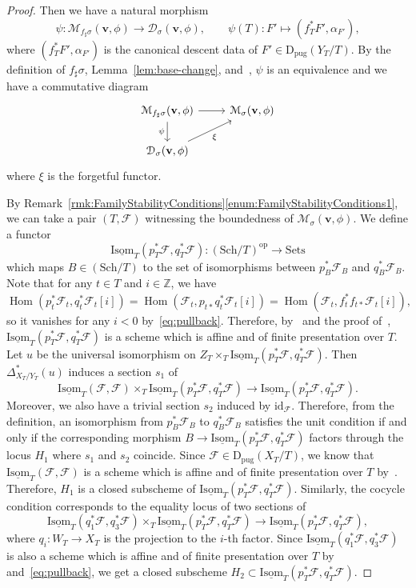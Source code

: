 \documentclass[11pt, reqno]{amsart}
\numberwithin{equation}{section}
\theoremstyle{plain}
\theoremstyle{remark}
\theoremstyle{definition}
\theoremstyle{italicsname}
\newcommand{\bv}{\mathbf{v}}
\newcommand{\Dpug}{\mathrm{D_{pug}}}
\DeclareMathOperator{\Hom}{Hom}
\newcommand{\cF}{\mathcal{F}}
\newcommand{\cM}{\mathcal{M}}
\def\ZZ{\ensuremath{\mathbb{Z}}}
\def\citestacks#1{\cite[\href{https://stacks.math.columbia.edu/tag/#1}{#1}]{stacks-project}}
\begin{document}
\begin{proof}
Then we have a natural morphism
\[
\psi\colon\cM_{f_{\sharp}{\sigma}}(\bv,\phi)\longrightarrow \mathcal{D}_{{\sigma}}(\bv,\phi), \qquad \psi(T)\colon F'\longmapsto (f^*_TF', \alpha_{F'}),
\]
where $(f^*_TF',\alpha_{F'})$ is the canonical descent data of $F'\in\Dpug(Y_T/T)$. 
By the definition of $f_{\sharp}{\sigma}$, Lemma~\ref{lem:base-change}, and~\citestacks{0DLH}, $\psi$ is an equivalence and we have a commutative diagram
\[
\begin{tikzcd}
	{\cM_{f_{\sharp}{\sigma}}(\bv,\phi)} & {\cM_{{\sigma}}(\bv,\phi)} \\
	{\mathcal{D}_{{\sigma}}(\bv,\phi)}
	\arrow[from=1-1, to=1-2]
	\arrow["\psi"', from=1-1, to=2-1]
	\arrow["\xi"', from=2-1, to=1-2]
\end{tikzcd}
\]
where $\xi$ is the forgetful functor. 

By Remark~\ref{rmk:FamilyStabilityConditions}\eqref{enum:FamilyStabilityConditions1}, we can take a pair $(T,\cF)$ witnessing the boundedness of $\cM_{{\sigma}}(\bv,\phi)$. 
We define a functor 
\[
\underline{\mathrm{Isom}}_T(p_T^*\cF, q_T^*\cF)\colon (\mathrm{Sch}/T)^{\mathrm{op}}\longrightarrow \mathrm{Sets} 
\]
which maps $B\in (\mathrm{Sch}/T)$ to the set of isomorphisms between $p_B^*\cF_B$ and $q_B^*\cF_B$. 
Note that for any $t\in T$ and $i\in \ZZ$, we have
\[
\Hom(p_t^*\cF_t, q_t^*\cF_t[i])=\Hom(\cF_t, p_{t*}q_t^*\cF_t[i])=\Hom(\cF_t, f_t^*f_{t*}\cF_t[i]),
\]
so it vanishes for any $i<0$ by~\eqref{eq:pullback}. 
Therefore, by~\citestacks{0DLC} and the proof of~\citestacks{0DPW}, $\underline{\mathrm{Isom}}_T(p_T^*\cF, q_T^*\cF)$ is a scheme which is affine and of finite presentation over $T$. 
Let $u$ be the universal isomorphism on $Z_T\times_T \underline{\mathrm{Isom}}_T(p_T^*\cF, q_T^*\cF)$. 
Then $\Delta_{X_T/Y_T}^*(u)$ induces a section $s_1$ of 
\[
\underline{\mathrm{Isom}}_T(\cF, \cF)\times_T\underline{\mathrm{Isom}}_T(p_T^*\cF, q_T^*\cF)\longrightarrow\underline{\mathrm{Isom}}_T(p_T^*\cF, q_T^*\cF).
\]
Moreover, we also have a trivial section $s_2$ induced by $\mathrm{id}_{\cF}$. 
Therefore, from the definition, an isomorphism from $p_B^*\cF_B$ to $q_B^*\cF_B$ satisfies the unit condition if and only if the corresponding morphism $B\to \underline{\mathrm{Isom}}_T(p_T^*\cF, q_T^*\cF)$ factors through the locus $H_1$ where $s_1$ and $s_2$ coincide. 
Since $\cF\in\Dpug(X_T/T)$, we know that $\underline{\mathrm{Isom}}_T(\cF,\cF)$ is a scheme which is affine and of finite presentation over $T$ by~\citestacks{0DLC}. 
Therefore, $H_1$ is a closed subscheme of $\underline{\mathrm{Isom}}_T(p_T^*\cF, q_T^*\cF)$. 
Similarly, the cocycle condition corresponds to the equality locus of two sections of
\[
\underline{\mathrm{Isom}}_T(q_1^*\cF, q_3^*\cF)\times_T\underline{\mathrm{Isom}}_T(p_T^*\cF, q_T^*\cF)\longrightarrow\underline{\mathrm{Isom}}_T(p_T^*\cF, q_T^*\cF),
\]
where $q_i\colon W_T\to X_T$ is the projection to the $i$-th factor. 
Since $\underline{\mathrm{Isom}}_T(q_1^*\cF, q_3^*\cF)$ is also a scheme which is affine and of finite presentation over $T$ by~\citestacks{0DLC} and~\eqref{eq:pullback}, we get a closed subscheme $H_2\subset \underline{\mathrm{Isom}}_T(p_T^*\cF, q_T^*\cF)$.


\end{proof}
\end{document}
